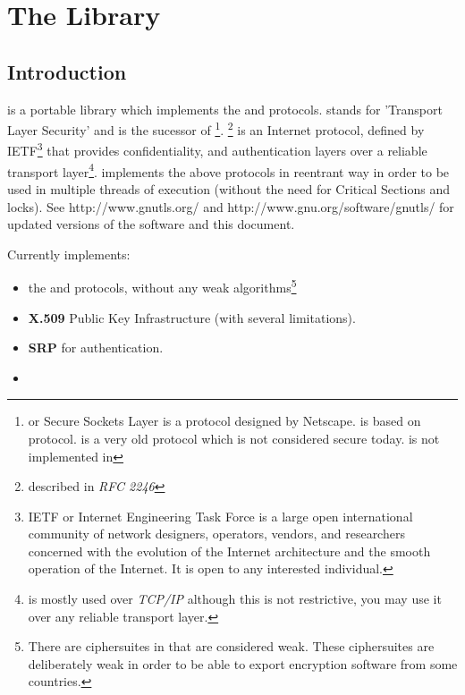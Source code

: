 \documentclass{book}
\begin{document}




\tableofcontents
\newpage
{}
\pagestyle{fancy}

\chapter{The Library}
\section{Introduction}
\par
\gnutls is a portable library which implements the \tlsI and 
\sslIII protocols.
\tls stands for 'Transport Layer Security' and is the sucessor of \ssl\footnote{
\ssl or Secure Sockets Layer is a protocol designed by Netscape. \tlsI is based on
\sslIII protocol. \sslII is a very old protocol which is 
not considered secure today. \sslII is not implemented in \gnutls}.
\tlsI\footnote{described in {\it RFC 2246}} is an Internet protocol,
defined by IETF\footnote{IETF or Internet Engineering Task Force 
is a large open international community of network
designers, operators, vendors, and researchers concerned with the evolution of 
the Internet architecture and the smooth operation of the Internet. It is open to any interested individual.}
that provides confidentiality, and authentication layers over a {reliable
transport layer}\footnote{\tls is mostly used over {\emph{TCP/IP}} although this is not restrictive, you may
use it over any reliable transport layer.}. \gnutls implements the
above protocols in reentrant way in order to be used in multiple threads of 
execution (without the need for Critical Sections and locks). See
http://www.gnutls.org/ and http://www.gnu.org/software/gnutls/ for
updated versions of the \gnutls software and this document.

\par
Currently \gnutls implements:
\begin{itemize}
 \item the \tlsI and \sslIII protocols, without any weak algorithms\footnote{
There are ciphersuites in \tlsI that are considered weak. These
ciphersuites are deliberately weak in order to be able to export encryption
software from some countries.}
 \item {\bf X.509} Public Key Infrastructure (with several limitations).
 \item {\bf SRP} for \tls authentication.
 \item {}
\end{itemize}
\end{document}
